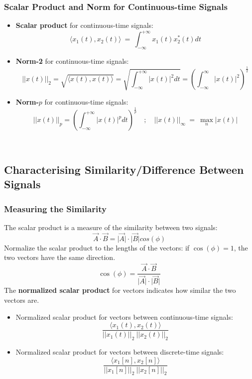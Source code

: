 \documentclass[12pt,a4paper]{article}
\begin{document}
\subsubsection{Scalar Product and Norm for Continuous-time Signals}
\begin{itemize}
 \item \textbf{Scalar product} for continuous-time signals:
  \[ \langle x_{1}(t), x_{2}(t) \rangle \ = \ \int_{-\infty}^{+\infty}  x_{1}(t) x_{2}^{*}(t) dt \]
 \item \textbf{Norm-2} for continuous-time signals:
  \[  \lvert \lvert x(t) \rvert \rvert_{2} = \sqrt{\langle x(t), x(t) \rangle} = \sqrt{\int_{-\infty}^{+\infty}\lvert
   x(t) \rvert^{2} dt} = \left( \int_{-\infty}^{\infty} \lvert x(t) \rvert^{2} \right) ^{\frac{1}{2}} \]
  \item \textbf{Norm-$p$} for continuous-time signals:
   \[ \lvert \lvert x(t) \rvert \rvert_{p} =\left( \int_{-\infty}^{+\infty} \lvert x(t) \rvert^{p} dt \right)^{\frac{1}{p}}
   \quad ; \quad \lvert \lvert x(t) \rvert \rvert_{\infty} \ = \ \max_{n}  \lvert x(t) \rvert \]
\end{itemize}
 
\ \\
\subsection{Characterising Similarity/Difference Between Signals}
\subsubsection{Measuring the Similarity}
 The scalar product is a measure of the similarity between two signals:
 \[ \vec{A} \cdot \vec{B} =\lvert \vec{A} \rvert \cdot \lvert \vec{B} \rvert cos(\phi) \]
 Normalize the scalar product to the lengths of the vectors: if $\cos(\phi)=1$, the two vectors have the same direction.
\[ \cos(\phi) = \frac{\vec{A} \cdot \vec{B}}{\lvert \vec{A} \rvert \cdot \lvert \vec{B} \rvert} \]
The \textbf{normalized scalar product} for vectors indicates how similar the two vectors are.
\begin{itemize}
 \item Normalized scalar product for vectors between continuous-time signals: 
 \[ \frac{\langle x_{1}(t), x_{2}(t) \rangle}{ \lvert \lvert x_{1}(t) \rvert \rvert_{2} \ \lvert \lvert x_{2}(t) \rvert \rvert_{2}} \]
 \item Normalized scalar product for vectors between discrete-time signals: 
 \[ \frac{\langle x_{1}[n], x_{2}[n] \rangle}{ \lvert \lvert x_{1}[n] \rvert \rvert_{2} \ \lvert \lvert x_{2}[n] \rvert \rvert_{2}} \]
 \end{itemize}
 
\end{document}
